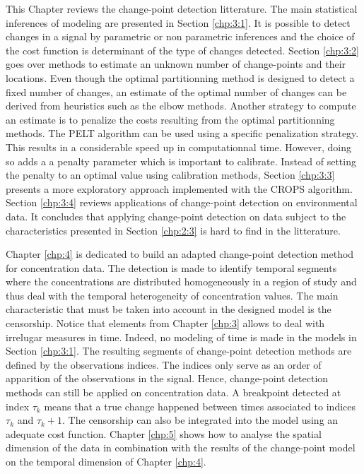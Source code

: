 This Chapter reviews the change-point detection litterature. The main statistical inferences of modeling are presented in Section \ref{chp:3:1}. It is possible to detect changes in a signal by parametric or non parametric inferences and the choice of the cost function is determinant of the type of changes detected. Section \ref{chp:3:2} goes over methods to estimate an unknown number of change-points and their locations. Even though the optimal partitionning method is designed to detect a fixed number of changes, an estimate of the optimal number of changes can be derived from heuristics such as the elbow methods. Another strategy to compute an estimate is to penalize the costs resulting from the optimal partitionning methods. The PELT algorithm can be used using a specific penalization strategy. This results in a considerable speed up in computationnal time. However, doing so adds a a penalty parameter which is important to calibrate. Instead of setting the penalty to an optimal value using calibration methods, Section \ref{chp:3:3} presents a more exploratory approach implemented with the CROPS algorithm. Section \ref{chp:3:4} reviews applications of change-point detection on environmental data. It concludes that applying change-point detection on data subject to the characteristics presented in Section \ref{chp:2:3} is hard to find in the litterature.  
 
Chapter \ref{chp:4} is dedicated to build an adapted change-point detection method for concentration data. The detection is made to identify temporal segments where the concentrations are distributed homogeneously in a region of study and thus deal with the temporal heterogeneity of concentration values. The main characteristic that must be taken into account in the designed model is the censorship. Notice that elements from Chapter \ref{chp:3} allows to deal with irrelugar measures in time. Indeed, no modeling of time is made in the models in Section \ref{chp:3:1}. The resulting segments of change-point detection methods are defined by the observations indices. The indices only serve as an order of apparition of the observations in the signal. Hence, change-point detection methods can still be applied on concentration data. A breakpoint detected at index $\tau_k$ means that a true change happened between times associated to indices $\tau_{k}$ and $\tau_{k}+1$. The censorship can also be integrated into the model using an adequate cost function. Chapter \ref{chp:5} shows how to analyse the spatial dimension of the data in combination with the results of the change-point model on the temporal dimension of Chapter \ref{chp:4}.        
